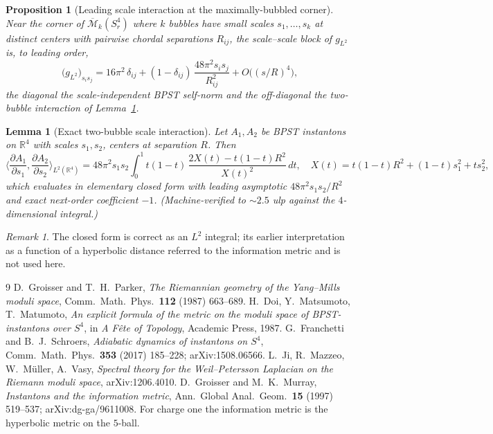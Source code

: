 \documentclass[11pt,letterpaper]{article}
\newcommand{\bbR}{\mathbb{R}}
\newcommand{\cM}{\mathcal{M}}
\theoremstyle{plain}
\newtheorem{proposition}[theorem]{Proposition}
\newtheorem{lemma}[theorem]{Lemma}
\theoremstyle{remark}
\newtheorem{remark}[theorem]{Remark}
\begin{document}
\begin{proposition}[Leading scale interaction at the maximally-bubbled corner]\label{prop:corner}
Near the corner of $\overline{\cM}_k(S^4_r)$ where $k$ bubbles have small scales $s_1,\dots,s_k$ at distinct centers with pairwise chordal separations $R_{ij}$, the scale--scale block of $g_{L^2}$ is, to leading order,
\[
  \big(g_{L^2}\big)_{s_i s_j} = 16\pi^2\,\delta_{ij} + (1-\delta_{ij})\,\frac{48\pi^2 s_i s_j}{R_{ij}^2} + O\!\big((s/R)^4\big),
\]
the diagonal the scale-independent BPST self-norm and the off-diagonal the two-bubble interaction of Lemma~\ref{lem:cross-term}.
\end{proposition}

\begin{lemma}[Exact two-bubble scale interaction]\label{lem:cross-term}
Let $A_1,A_2$ be BPST instantons on $\bbR^4$ with scales $s_1,s_2$, centers at separation $R$. Then
\[
  \Big\langle \frac{\partial A_1}{\partial s_1},\frac{\partial A_2}{\partial s_2}\Big\rangle_{L^2(\bbR^4)}
  = 48\pi^2 s_1 s_2 \int_0^1 t(1-t)\,\frac{2X(t)-t(1-t)R^2}{X(t)^2}\,dt,
  \quad X(t)=t(1-t)R^2+(1-t)s_1^2+t s_2^2,
\]
which evaluates in elementary closed form with leading asymptotic $48\pi^2 s_1s_2/R^2$ and exact next-order coefficient $-1$. (Machine-verified to $\sim2.5$ ulp against the $4$-dimensional integral.)
\end{lemma}

\begin{remark}
The closed form is correct as an $L^2$ integral; its earlier interpretation as a function of a hyperbolic distance referred to the information metric and is not used here.
\end{remark}

\begin{thebibliography}{9}
 D.\ Groisser and T.~H.\ Parker, \emph{The Riemannian geometry of the Yang--Mills moduli space}, Comm.\ Math.\ Phys.\ \textbf{112} (1987) 663--689.
 H.\ Doi, Y.\ Matsumoto, T.\ Matumoto, \emph{An explicit formula of the metric on the moduli space of BPST-instantons over $S^4$}, in \emph{A F\^ete of Topology}, Academic Press, 1987.
 G.\ Franchetti and B.~J.\ Schroers, \emph{Adiabatic dynamics of instantons on $S^4$}, Comm.\ Math.\ Phys.\ \textbf{353} (2017) 185--228; arXiv:1508.06566.
 L.\ Ji, R.\ Mazzeo, W.\ M\"uller, A.\ Vasy, \emph{Spectral theory for the Weil--Petersson Laplacian on the Riemann moduli space}, arXiv:1206.4010.
 D.\ Groisser and M.~K.\ Murray, \emph{Instantons and the information metric}, Ann.\ Global Anal.\ Geom.\ \textbf{15} (1997) 519--537; arXiv:dg-ga/9611008. For charge one the information metric is the hyperbolic metric on the $5$-ball.
\end{thebibliography}
\end{document}
